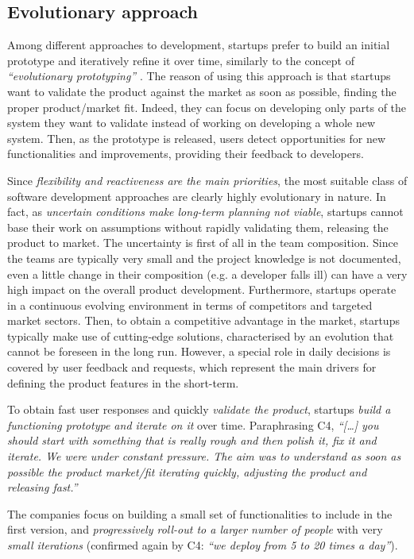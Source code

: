 \documentclass[10pt,journal,letterpaper,compsoc]{IEEEtran}
\begin{document}
\subsection{Evolutionary approach}
\label{res:gsm:cat2}
Among different approaches to development, startups prefer to build an initial prototype and iteratively refine it over time, similarly to the concept of \textit{``evolutionary prototyping''} \cite{EvProt}.  The reason of using this approach is that startups want to validate the product against the market as soon as possible, finding the proper product/market fit. Indeed, they can focus on developing only parts of the system they want to validate instead of working on developing a whole new system. Then, as the prototype is released, users detect opportunities for new functionalities and improvements, providing their feedback to developers.


Since \textit{flexibility and reactiveness are the main priorities}, the most suitable class of software development approaches are clearly highly evolutionary in nature. In fact, as \textit{uncertain conditions make long-term planning not viable}, startups cannot base their work on assumptions without rapidly validating them, releasing the product to market. The uncertainty is first of all in the team composition. Since the teams are typically very small and the project knowledge is not documented, even a little change in their composition (e.g. a developer falls ill) can have a very high impact on the overall product development. Furthermore, startups operate in a continuous evolving environment in terms of competitors and targeted market sectors. Then, to obtain a competitive advantage in the market, startups typically make use of cutting-edge solutions, characterised by an evolution that cannot be foreseen in the long run. However, a special role in daily decisions is covered by user feedback 
and requests, which represent the main drivers for defining the product features in the short-term.

To obtain fast user responses and quickly \textit{validate the product}, startups \textit{build a functioning prototype and iterate on it} over time. Paraphrasing C4, \textit{``[\ldots] you should start with something that is really rough and then polish it, fix it and iterate. We were under constant pressure. The aim was to understand as soon as possible the product market/fit iterating quickly, adjusting the product and releasing fast.''}

The companies focus on building a small set of functionalities to include in the first version, and \textit{progressively roll-out to a larger number of people} with very \textit{small iterations} (confirmed again by C4: \textit{``we deploy from 5 to 20 times a day''}).
\end{document}

